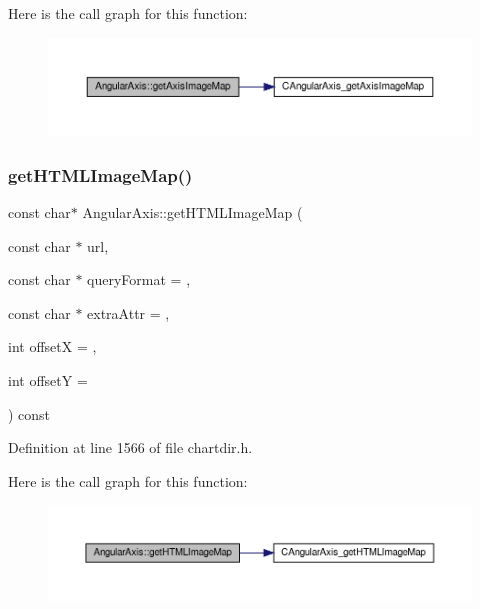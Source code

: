 Here is the call graph for this function\+:
\nopagebreak
\begin{figure}[H]
\begin{center}
\leavevmode
\includegraphics[width=350pt]{class_angular_axis_a6d9609544b763a5af1f6eb4e24165ea6_cgraph}
\end{center}
\end{figure}
\mbox{\label{class_angular_axis_ad7ee19adef39f7ce7fb1ce5bf2941b0d}} 
\subsubsection{\texorpdfstring{get\+H\+T\+M\+L\+Image\+Map()}{getHTMLImageMap()}}
{\footnotesize\ttfamily const char$\ast$ Angular\+Axis\+::get\+H\+T\+M\+L\+Image\+Map (\begin{DoxyParamCaption}\item[{const char $\ast$}]{url,  }\item[{const char $\ast$}]{query\+Format = {},  }\item[{const char $\ast$}]{extra\+Attr = {},  }\item[{int}]{offsetX = {},  }\item[{int}]{offsetY = {} }\end{DoxyParamCaption}) const\hspace{0.3cm}{\ttfamily [inline]}}



Definition at line 1566 of file chartdir.\+h.

Here is the call graph for this function\+:
\nopagebreak
\begin{figure}[H]
\begin{center}
\leavevmode
\includegraphics[width=350pt]{class_angular_axis_ad7ee19adef39f7ce7fb1ce5bf2941b0d_cgraph}
\end{center}
\end{figure}
\mbox{\label{class_angular_axis_ae305f4e4b0d300b6b8e63a0f2645368c}} 
